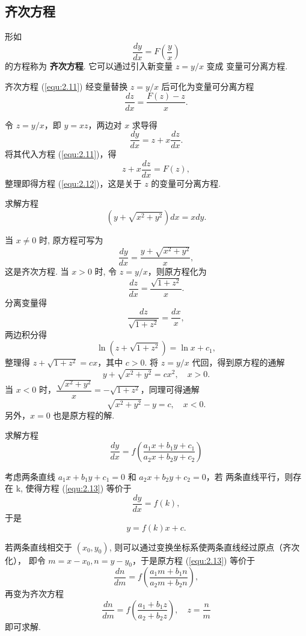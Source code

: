 \subsection{齐次方程}
形如
\begin{equation}\label{equ:2.11}
\frac{dy}{dx}=F(\frac{y}{x})
\end{equation}
的方程称为 \textbf{齐次方程}. 它可以通过引入新变量 $z=y/x$ 变成
变量可分离方程.

\begin{thm}
齐次方程 (\ref{equ:2.11}) 经变量替换 $z=y/x$ 后可化为变量可分离方程
\begin{equation}\label{equ:2.12}
\frac{dz}{dx}=\frac{F(z)-z}{x}.
\end{equation}
\end{thm}
\begin{pf1}
令 $z=y/x$，即 $y=xz$，两边对 $x$ 求导得
\[
\frac{dy}{dx}=z+x\frac{dz}{dx}.
\]
将其代入方程 (\ref{equ:2.11})，得
\[
z+x\frac{dz}{dx}=F(z),
\]
整理即得方程 (\ref{equ:2.12})，这是关于 $z$ 的变量可分离方程.
\end{pf1}

\begin{eg}
求解方程
\[
(y+\sqrt{x^2+y^2})dx=xdy.
\]
\begin{pf2}
当 $x\neq0$ 时, 原方程可写为
\[
\frac{dy}{dx}=\frac{y+\sqrt{x^2+y^2}}{x},
\]
这是齐次方程. 当 $x>0$ 时, 令 $z=y/x$，则原方程化为
\[
\frac{dz}{dx}=\frac{\sqrt{1+z^2}}{x}.
\]
分离变量得
\[
\frac{dz}{\sqrt{1+z^2}}=\frac{dx}{x},
\]
两边积分得
\[
\ln(z+\sqrt{1+z^2})=\ln x+c_1,
\]
整理得 $z+\sqrt{1+z^2}=cx$，其中 $c>0$. 将 $z=y/x$ 代回，得到原方程的通解
\[
y+\sqrt{x^2+y^2}=cx^2,\quad x>0.
\]
当 $x<0$ 时，$\dfrac{\sqrt{x^2+y^2}}{x}=-\sqrt{1+z^2}$，同理可得通解
\[
\sqrt{x^2+y^2}-y=c,\quad x<0.
\]
另外，$x=0$ 也是原方程的解.
\end{pf2}
\end{eg}

\begin{eg}
求解方程
\begin{equation}\label{equ:2.13}
\frac{dy}{dx}=f\left(\frac{a_1x+b_1y+c_1}{a_2x+b_2y+c_2}\right)
\end{equation}
\end{eg}
\begin{pf1}
考虑两条直线 $a_1 x+b_1 y+c_1=0$ 和 $a_2 x+b_2 y+c_2=0$，若
两条直线平行，则存在 k, 使得方程 (\ref{equ:2.13}) 等价于
\[
\frac{dy}{dx}=f(k),
\]
于是
\[
y=f(k)x+c.
\]

若两条直线相交于 $(x_0,y_0)$, 则可以通过变换坐标系使两条直线经过原点（齐次化），
即令 $m=x-x_0, n=y-y_0$，于是原方程 (\ref{equ:2.13}) 等价于
\[
\frac{dn}{dm}=f\left(\frac{a_1m+b_1n}{a_2m+b_2n}\right),
\]
再变为齐次方程
\[
\frac{dn}{dm}=f\left(\frac{a_1+b_1z}{a_2+b_2z}\right),\quad z=\frac{n}{m}
\]
即可求解.
\end{pf1}


